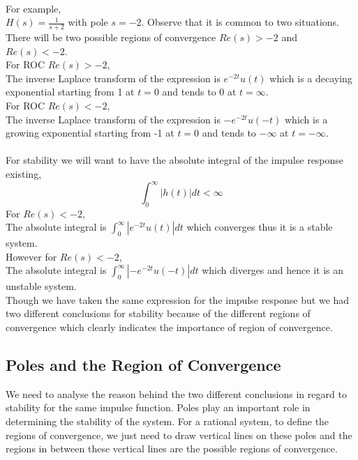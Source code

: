\paragraph*{ }
For example, \\
$H(s) = \frac{1}{s+2}$ with pole $s = -2$. Observe that it is common to two situations. There will be two possible regions of convergence $Re(s) > -2$ and $Re(s) < -2$. \\
For ROC $Re(s) > -2$, \\
The inverse Laplace transform of the expression is $e^{-2t}u(t)$ which is a decaying exponential starting from 1 at $t = 0$ and tends to 0 at $t = \infty$.\\
For ROC $Re(s) < -2$, \\
The inverse Laplace transform of the expression is $-e^{-2t}u(-t)$ which is a growing exponential starting from -1 at $t = 0$ and tends to $-\infty$ at $t = - \infty$. 
\paragraph*{ }

For stability we will want to have the absolute integral of the impulse response existing,
\[
	 \int_{0}^{\infty}{|h(t)|dt} < \infty
\]
For $Re(s) < -2$, \\
The absolute integral is $
	 \int_{0}^{\infty}{|e^{-2t}u(t)|dt}$
which converges thus it is a stable system. \\
However for $Re(s) < -2$, \\
The absolute integral is $
	 \int_{0}^{\infty}{|-e^{-2t}u(-t)|dt}$
which diverges and hence it is an unstable system. \\

Though we have taken the same expression for the impulse response
but we had two different conclusions for stability because of the different regions of convergence which clearly indicates the importance of region of convergence.

\subsection{Poles and the Region of Convergence}
We need to analyse the reason behind the two different conclusions in regard to stability for the same impulse function. Poles play an important role in determining the stability of the system. For a rational system, to define the regions of convergence, we just need to draw vertical lines on these poles and the regions in between these vertical lines are the possible regions of convergence.

